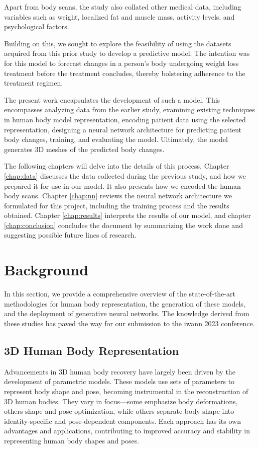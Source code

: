 Apart from body scans, the study also collated other medical data, including
variables such as weight, localized fat and muscle mass, activity levels, and
psychological factors.

Building on this, we sought to explore the feasibility of using the datasets
acquired from this prior study to develop a predictive model. The intention was
for this model to forecast changes in a person's body undergoing weight loss
treatment before the treatment concludes, thereby bolstering adherence to the
treatment regimen.

The present work encapsulates the development of such a model. This encompasses
analyzing data from the earlier study, examining existing techniques in human
body model representation, encoding patient data using the selected
representation, designing a neural network architecture for predicting patient
body changes, training, and evaluating the model. Ultimately, the model
generates 3D meshes of the predicted body changes.

The following chapters will delve into the details of this process. Chapter
\ref{chap:data} discusses the data collected during the previous study, and how
we prepared it for use in our model. It also presents how we encoded the human
body scans. Chapter \ref{chap:nn} reviews the neural network architecture we
formulated for this project, including the training process and the results
obtained. Chapter \ref{chap:results} interprets the results of our model, and
chapter \ref{chap:conclusion} concludes the document by summarizing the work
done and suggesting possible future lines of research.

\section{Background}

In this section, we provide a comprehensive overview of the state-of-the-art
methodologies for human body representation, the generation of these models,
and the deployment of generative neural networks. The knowledge derived from
these studies has paved the way for our submission to the \gls{iwann} 2023
conference. 

\subsection{3D Human Body Representation}

Advancements in 3D human body recovery have largely been driven by the
development of parametric models. These models use sets of parameters to
represent body shape and pose, becoming instrumental in the reconstruction of
3D human bodies. They vary in focus—some emphasize body deformations, others
shape and pose optimization, while others separate body shape into
identity-specific and pose-dependent components. Each approach has its own
advantages and applications, contributing to improved accuracy and stability in
representing human body shapes and poses.

